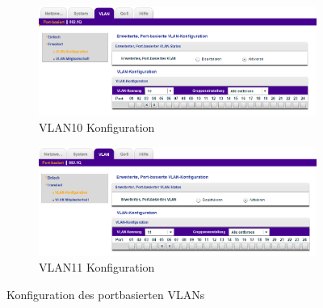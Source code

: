         \begin{figure}[H]
        \centering
            \begin{subfigure}{\linewidth}
                \centering
                \includegraphics[scale=0.45]{images/Trennung durch VLAN herstellen/VLAN10_Konfiguration.png}
                \caption{VLAN10 Konfiguration}
            \end{subfigure}
            \begin{subfigure}{\linewidth}
                \centering
                \includegraphics[scale=0.45]{images/Trennung durch VLAN herstellen/VLAN11_Konfiguration.png}
                \caption{VLAN11 Konfiguration}
            \end{subfigure}
        \caption{Konfiguration des portbasierten VLANs}
        \end{figure}

